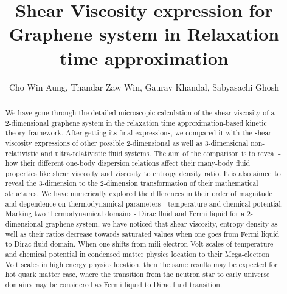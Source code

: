 \documentclass[amsmath,amssymb,aps,prb]{revtex4-2}
\begin{document}
%
\title{Shear Viscosity expression for Graphene system in Relaxation time approximation}
%
\author{Cho Win Aung, Thandar Zaw Win, Gaurav Khandal,
Sabyasachi Ghosh}
%
%
\begin{abstract}
We have gone through the detailed microscopic calculation of the shear viscosity of a 2-dimensional graphene system in the 
relaxation time approximation-based kinetic theory framework. After getting its final expressions, we compared
it with the shear viscosity expressions of other possible 2-dimensional as well as 3-dimensional non-relativistic and 
ultra-relativistic fluid systems. The aim of the comparison is to reveal - how their different one-body dispersion relations
affect their many-body fluid properties like shear viscosity and viscosity to entropy density ratio. It is also aimed to
reveal the 3-dimension to the 2-dimension transformation of their mathematical structures. We have numerically
explored the differences in their order of magnitude and dependence on thermodynamical parameters - temperature and chemical
potential. Marking two thermodynamical domains - Dirac fluid and Fermi liquid for a 2-dimensional graphene system, we have noticed
that shear viscosity, entropy density as well as their ratios decrease towards saturated values when one goes from Fermi liquid
to Dirac fluid domain. When one shifts from mili-electron Volt scales of temperature and chemical potential in condensed matter physics
location to their Mega-electron Volt scales in high energy physics location, then the same results may be expected for hot quark matter case,
where the transition from the neutron star to early universe domains may be considered as Fermi liquid to Dirac fluid transition. 



\end{abstract}
\end{document}
